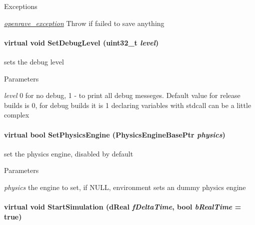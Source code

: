 \begin{DoxyExceptions}{Exceptions}
\item[{\em \hyperlink{classOpenRAVE_1_1openrave__exception}{openrave\_\-exception}}]Throw if failed to save anything \end{DoxyExceptions}
\hypertarget{classOpenRAVE_1_1EnvironmentBase_a3b4f2f14db4059585686d8e457190df7}{
\paragraph[{SetDebugLevel}]{\setlength{\rightskip}{0pt plus 5cm}virtual void SetDebugLevel (uint32\_\-t {\em level})}\hfill}
\label{classOpenRAVE_1_1EnvironmentBase_a3b4f2f14db4059585686d8e457190df7}
sets the debug level 
\begin{DoxyParams}{Parameters}
\item[{\em level}]0 for no debug, 1 -\/ to print all debug messeges. Default value for release builds is 0, for debug builds it is 1 declaring variables with stdcall can be a little complex \end{DoxyParams}
\hypertarget{classOpenRAVE_1_1EnvironmentBase_a4b682d62526e5840d8fdc25343ee563c}{
\paragraph[{SetPhysicsEngine}]{\setlength{\rightskip}{0pt plus 5cm}virtual bool SetPhysicsEngine (PhysicsEngineBasePtr {\em physics})}\hfill}
\label{classOpenRAVE_1_1EnvironmentBase_a4b682d62526e5840d8fdc25343ee563c}
set the physics engine, disabled by default 
\begin{DoxyParams}{Parameters}
\item[{\em physics}]the engine to set, if NULL, environment sets an dummy physics engine \end{DoxyParams}
\hypertarget{classOpenRAVE_1_1EnvironmentBase_a4e00e5f00d51ae10aa6bc017f827fea7}{
\paragraph[{StartSimulation}]{\setlength{\rightskip}{0pt plus 5cm}virtual void StartSimulation (dReal {\em fDeltaTime}, \/  bool {\em bRealTime} = {\ttfamily true})}\hfill}
\label{classOpenRAVE_1_1EnvironmentBase_a4e00e5f00d51ae10aa6bc017f827fea7}



